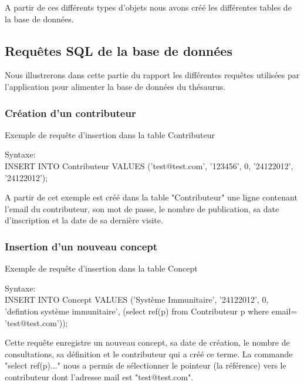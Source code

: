 A partir de ces différents types d'objets nous avons créé les différentes tables de la base de données. 



\subsection{Requêtes SQL de la base de données}

Nous illustrerons dans cette partie du rapport les différentes requêtes utilisées par l'application pour alimenter la base de données du thésaurus.

\subsubsection{Création d'un contributeur}

\begin{algorithm}[H]
\caption{\label{Requete_Contributeur} Exemple de requête d'insertion dans la table Contributeur}
Syntaxe:\\
INSERT INTO Contributeur VALUES ('test@test.com', '123456', 0, '24122012', '24122012');\\
\end{algorithm}

A partir de cet exemple est créé dans la table "Contributeur" une ligne contenant l'email du contributeur, son mot de passe, le nombre de publication, sa date d'inscription et la date de sa dernière visite.

\subsubsection{Insertion d'un nouveau concept}

\begin{algorithm}[H]
\caption{\label{Requete_Concept} Exemple de requête d'insertion dans la table Concept}
Syntaxe:\\
INSERT INTO Concept VALUES ('Système Immunitaire', '24122012', 0, 'defintion système immunitaire', (select ref(p) from Contributeur p  where email= 'test@test.com'));\\
\end{algorithm}

Cette requête enregistre un nouveau concept, sa date de création, le nombre de consultations, sa définition et le contributeur qui a créé ce terme. La commande "select ref(p)..." nous a permis de sélectionner le pointeur (la référence) vers le contributeur dont l'adresse mail est "test@test.com".


